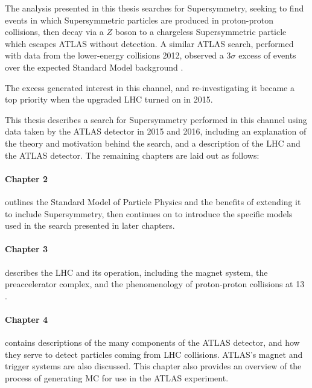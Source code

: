 The analysis presented in this thesis searches for Supersymmetry, seeking to find events in which Supersymmetric particles are produced in proton-proton collisions, then decay via a $Z$ boson to a chargeless Supersymmetric particle which escapes \ac{ATLAS} without detection. A similar \ac{ATLAS} search, performed with data from the lower-energy collisions 2012, observed a $3\sigma$ excess of events over the expected Standard Model background \cite{SUSY-2014-10}. 

The excess generated interest in this channel, and re-investigating it became a top priority when the upgraded \ac{LHC} turned on in 2015. %

This thesis describes a search for Supersymmetry performed in this channel using data taken by the \ac{ATLAS} detector in 2015 and 2016, including an explanation of the theory and motivation behind the search, and a description of the \ac{LHC} and the \ac{ATLAS} detector. The remaining chapters are laid out as follows: 

\paragraph{Chapter 2} outlines the Standard Model of Particle Physics and the benefits of extending it to include Supersymmetry, then continues on to introduce the specific models used in the search presented in later chapters. 

\paragraph{Chapter 3} describes the \ac{LHC} and its operation, including the magnet system, the preaccelerator complex, and the phenomenology of proton-proton collisions at 13 \tev.

\paragraph{Chapter 4} contains descriptions of the many components of the \ac{ATLAS} detector, and how they serve to detect particles coming from \ac{LHC} collisions. \ac{ATLAS}'s magnet and trigger systems are also discussed. This chapter also provides an overview of the process of generating \ac{MC} for use in the \ac{ATLAS} experiment.

